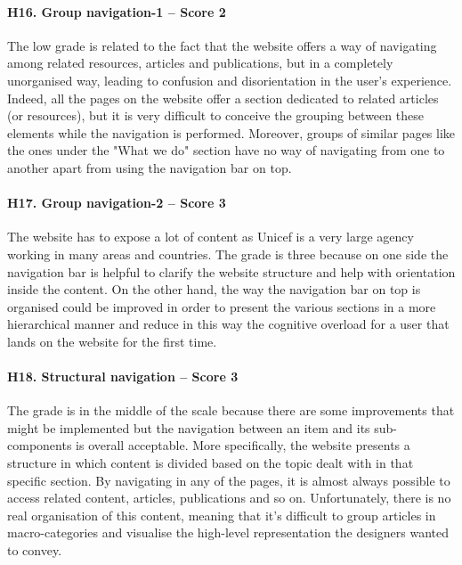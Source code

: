\paragraph*{H16. Group navigation-1  – Score 2}
The low grade is related to the fact that the website offers a way of navigating among related resources, articles and publications, but in a completely unorganised way, leading to confusion and disorientation in the user's experience. Indeed, all the pages on the website offer a section dedicated to related articles (or resources), but it is very difficult to conceive the grouping between these elements while the navigation is performed.
Moreover, groups of similar pages like the ones under the "What we do" section have no way of navigating from one to another apart from using the navigation bar on top.

	
	
\paragraph*{H17. Group navigation-2 – Score 3}
The website has to expose a lot of content as Unicef is a very large agency working in many areas and countries. The grade is three because on one side the navigation bar is helpful to clarify the website structure and help with orientation inside the content. On the other hand, the way the navigation bar on top is organised could be improved in order to present the various sections in a more hierarchical manner and reduce in this way the cognitive overload for a user that lands on the website for the first time.

\paragraph*{H18. Structural navigation  – Score 3}
The grade is in the middle of the scale because there are some improvements that might be implemented but the navigation between an item and its sub-components is overall acceptable. More specifically, the website presents a structure in which content is divided based on the topic dealt with in that specific section. By navigating in any of the pages, it is almost always possible to access related content, articles, publications and so on. Unfortunately, there is no real organisation of this content, meaning that it's difficult to group articles in macro-categories and visualise the high-level representation the designers wanted to convey.

